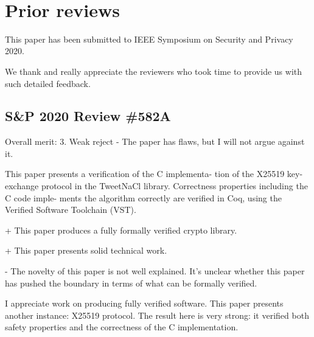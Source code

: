 \newpage
~\\
\newpage

\section{Prior reviews}
\label{appendix:past-reviews}

This paper has been submitted to IEEE Symposium on Security and Privacy 2020.

We thank and really appreciate the reviewers who took time to provide us with
such detailed feedback.

\subsection{S\&P 2020 Review \#582A}

Overall merit: 3. Weak reject - The paper has flaws, but I will
not argue against it.

\begin{center}
\end{center}

This paper presents a verification of the C implementa-
tion of the X25519 key-exchange protocol in the TweetNaCl
library. Correctness properties including the C code imple-
ments the algorithm correctly are verified in Coq, using the
Verified Software Toolchain (VST).


\begin{center}
\end{center}

+ This paper produces a fully formally verified crypto library.

+ This paper presents solid technical work.


\begin{center}
\end{center}

- The novelty of this paper is not well explained. It’s unclear
whether this paper has pushed the boundary in terms of what
can be formally verified.


\begin{center}
\end{center}

I appreciate work on producing fully verified software. This
paper presents another instance: X25519 protocol. The result
here is very strong: it verified both safety properties and the
correctness of the C implementation.

